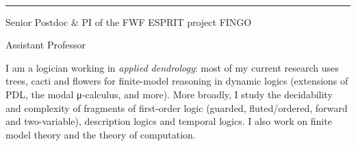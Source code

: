 \documentclass[10pt,a4paper]{article}
\begin{document}
{\FiraLight\fontsize{25}{27}\selectfont\color{ink}\FirstName\ \MiddleName}\par\vspace{1mm}
{\FiraSemi\fontsize{38}{40}\selectfont\color{ink}\LastName}\par\vspace{2.5mm}
{\color{accent}\rule{16mm}{1.6pt}}\par\vspace{3mm}
{\FiraMedium\color{ink}Senior Postdoc \& PI of the FWF ESPRIT project FINGO}\,\par\vspace{0.6mm}
{\FiraMedium\color{ink}Assistant Professor}\,\par\vspace{5mm}

{\linespread{1.18}\selectfont\raggedright
I am a logician working in \emph{applied dendrology}: most of my current research uses trees, cacti and
flowers for finite-model reasoning in dynamic logics (extensions of PDL, the modal μ-calculus, and more).
More broadly, I study the decidability and complexity of fragments of first-order logic (guarded,
fluted/ordered, forward and two-variable), description logics and temporal logics. I also work on finite
model theory and the theory of computation.\par}
\vspace{4.5mm}
\end{document}
